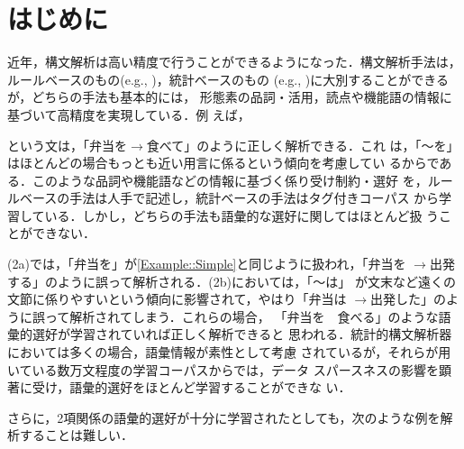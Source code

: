 \documentclass[japanese]{jnlp_1.3e}
\begin{document}
\maketitle



\newcommand{\argmax}[2]{}
\def\qline#1#2{}



\section{はじめに}

近年，構文解析は高い精度で行うことができるようになった．構文解析手法は，
ルールベースのもの(e.g., \cite{Kurohashi1994})，統計ベースのもの
(e.g., \cite{Kudo2002})に大別することができるが，どちらの手法も基本的には，
形態素の品詞・活用，読点や機能語の情報に基づいて高精度を実現している．例
えば，

\begin{lingexample}
\end{lingexample}

\noindent
という文は，「弁当を$\rightarrow$食べて」のように正しく解析できる．これ
は，「〜を」はほとんどの場合もっとも近い用言に係るという傾向を考慮してい
るからである．このような品詞や機能語などの情報に基づく係り受け制約・選好
を，ルールベースの手法は人手で記述し，統計ベースの手法はタグ付きコーパス
から学習している．しかし，どちらの手法も語彙的な選好に関してはほとんど扱
うことができない．

\begin{lingexample} \label{Example::Undoable1}
\end{lingexample}

(2a)では，「弁当を」が\ref{Example::Simple}と同じように扱われ，「弁当を
$\rightarrow$出発する」のように誤って解析される．(2b)においては，「〜は」
が文末など遠くの文節に係りやすいという傾向に影響されて，やはり「弁当は
$\rightarrow$出発した」のように誤って解析されてしまう．これらの場合，
「弁当を　食べる」のような語彙的選好が学習されていれば正しく解析できると
思われる．統計的構文解析器においては多くの場合，語彙情報が素性として考慮
されているが，それらが用いている数万文程度の学習コーパスからでは，データ
スパースネスの影響を顕著に受け，語彙的選好をほとんど学習することができな
い．

さらに，2項関係の語彙的選好が十分に学習されたとしても，次のような例を解
析することは難しい．

\begin{lingexample}
\end{lingexample}
\end{document}
